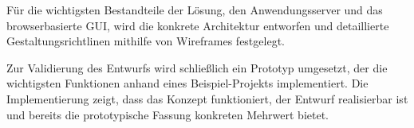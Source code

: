 Für die wichtigsten Bestandteile der Lösung, den Anwendungsserver und das browserbasierte GUI, wird die konkrete Architektur entworfen und detaillierte Gestaltungsrichtlinen mithilfe von Wireframes festgelegt.

Zur Validierung des Entwurfs wird schließlich ein Prototyp umgesetzt, der die wichtigsten Funktionen anhand eines Beispiel-Projekts implementiert. Die Implementierung zeigt, dass das Konzept funktioniert, der Entwurf realisierbar ist und bereits die prototypische Fassung konkreten Mehrwert bietet.